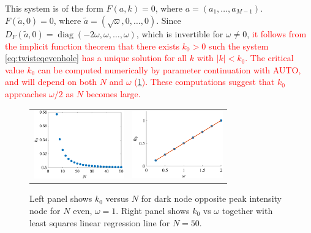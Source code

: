 \documentclass[reprint, amsmath,amssymb,aps,pra]{revtex4-2}
\DeclareMathOperator{\diag}{diag}
\renewcommand{\revised}[1]{ \textcolor{red}{#1} }
\begin{document}
This system is of the form $F(a,k) = 0$, where $a = (a_1, \dots, a_{M-1})$. $F(\tilde{a}, 0) = 0$, where $\tilde{a} = (\sqrt{\omega}, 0, \dots, 0)$. Since $D_F(\tilde{a}, 0) = \diag(-2\omega,\omega, \dots, \omega)$, which is invertible for $\omega \neq 0$, \revised{it follows from the implicit function theorem that there exists $k_0 > 0$ such the system \cref{eq:twisteqevenhole} has a unique solution for all $k$ with $|k| < k_0$. The critical value $k_0$ can be computed numerically by parameter continuation with AUTO, and will depend on both $N$ and $\omega$ (\cref{fig:k0plot}). These computations suggest that $k_0$ approaches $\omega/2$ as $N$ becomes large.}

\begin{figure}
    \begin{center}
    \begin{tabular}{cc}
    \includegraphics[width=3.9cm]{images/k0vsN} &
    \includegraphics[width=3.9cm]{images/k0vsomega.eps}
    \end{tabular}
    \end{center}
    \caption{Left panel shows $k_0$ versus $N$ for dark node opposite peak intensity node for $N$ even, $\omega = 1$. Right panel shows $k_0$ vs $\omega$ together with least squares linear regression line for $N = 50$.}
    \label{fig:k0plot}
\end{figure}
\end{document}
